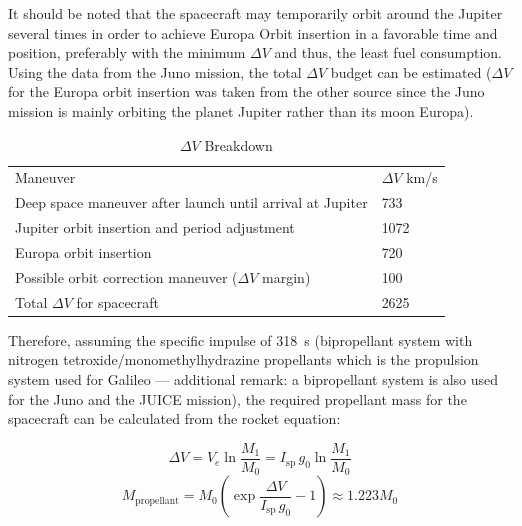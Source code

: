 It should be noted that the spacecraft may temporarily orbit around
the Jupiter several times in order to achieve Europa Orbit insertion
in a favorable time and position, preferably with the minimum
$\Delta V$ and thus, the least fuel consumption. Using the data from
the Juno mission, the total $\Delta V$ budget can be estimated
\cite{DMullerNet} ($\Delta V$ for the Europa orbit insertion was taken
from the other source since the Juno mission is mainly orbiting the
planet Jupiter rather than its moon Europa). \cite{TrajectoryDesign}

\begin{longtable}{ll}
  \caption{$\Delta V$ Breakdown} \\
  Maneuver & $\Delta V$ \si{km/s} \\

  Deep space maneuver after launch until arrival at Jupiter & 733 \\

  Jupiter orbit insertion and period adjustment & 1072 \\

  Europa orbit insertion & 720 \\

  Possible orbit correction maneuver ($\Delta V$ margin) & 100 \\

  Total $\Delta V$ for spacecraft & 2625 \\
\end{longtable}

Therefore, assuming the specific impulse of \SI{318}{s} (bipropellant
system with nitrogen tetroxide/monomethylhydrazine propellants which
is the propulsion system used for Galileo --- additional remark: a
bipropellant system is also used for the Juno and the JUICE
mission)\cite{Ampac}, the required propellant mass for the spacecraft
can be calculated from the rocket equation:

\begin{equation}
  \Delta V = V_e \ln \frac{M_1}{M_0}
  = I_{\mathrm{sp}} \, g_0 \ln \frac{M_1}{M_0}
\end{equation}
\begin{equation}
  M_{\mathrm{propellant}}
  = M_0 \left( \exp \frac{\Delta V}{I_{\mathrm{sp}} \, g_0} - 1 \right)
    \approx 1.223 M_0
\end{equation}
